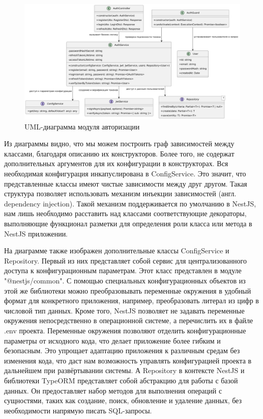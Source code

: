 	\begin{figure}[ht!] 
		\center
		\includegraphics [scale=0.2] {my_folder/images//uml_auth}
		\caption{UML-диаграмма модуля авторизации} 
		\label{fig:uml_auth}  
	\end{figure}

	Из диаграммы видно, что мы можем построить граф зависимостей между классами, благодаря описанию их конструкторов. Более того, не содержат дополнительных аргументов для их конфигурации в конструкторах. Вся необходимая конфигурация инкапуслирована в ConfigService. Это значит, что представленные классы имеют чистые зависимости между друг другом. Такая структура позволяет использовать механизм инъекции зависимостей (англ. dependency injection). Такой механизм поддерживается по умолчанию в NestJS, нам лишь необходимо расставить над классами соответствующие декораторы, выполняющие функционал разметки для определения роли класса или метода в NestJS приложении.

	На диаграмме также изображен дополнительные классы ConfigService и Repository. Первый из них представляет собой сервис для централизованного доступа к конфигурационным параметрам. Этот класс представлен в модуле "@nestjs/common". С помощью специальных конфигурационных объектов из этой же библиотеки можно преобразовывать переменные окружения в удобный формат для конкретного приложения, например, преобразовать литерал из цифр в числовой тип данных. Кроме того, NestJS позволяет не задавать переменные окружения непосредственно в операционной системе, а перечислить их в файле .env проекта. Переменные окружения позволяют отделить конфигурационные параметры от исходного кода, что делает приложение более гибким и безопасным. Это упрощает адаптацию приложения к различным средам без изменения кода, что даст нам возможность управлять конфигурацией проекта в дальнейшем при развёртывании системы. А Repository в контексте NestJS и библиотеки TypeORM представляет собой абстракцию для работы с базой данных. Он предоставляет набор методов для выполнения операций с сущностями, таких как создание, поиск, обновление и удаление данных, без необходимости напрямую писать SQL-запросы.

